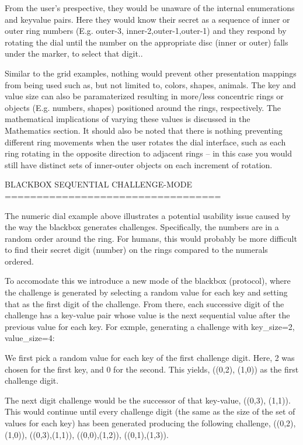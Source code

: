 \documentclass[12pt]{document}
\begin{document}
\begin{Introduction}
From the user's prespective, they would be unaware of the internal enumerations and keyvalue pairs.
Here they would know their secret as a sequence of inner or outer ring numbers (E.g. outer-3, inner-2,outer-1,outer-1) and they respond by rotating the dial until the number on the appropriate disc (inner or outer) falls under the marker, to select that digit..

Similar to the grid examples, nothing would prevent other presentation mappings from being used such as, but not limited to, colors, shapes, animals.
The key and value size can also be paramaterized resulting in more/less concentric rings or objects (E.g. numbers, shapes) positioned around the rings, respectively.
The mathematical implications of varying these values is discussed in the Mathematics section.
It should also be noted that there is nothing preventing different ring movements when the user rotates the dial interface, such as each ring rotating in the opposite direction to adjacent rings -- in this case you would still have distinct sets of inner-outer objects on each increment of rotation.


BLACKBOX SEQUENTIAL CHALLENGE-MODE
==================================

The numeric dial example above illustrates a potential usability issue caused by the way the blackbox generates challenges. Specifically, the numbers are in a random order around the ring. For humans, this would probably be more difficult to find their secret digit (number) on the rings compared to the numerals ordered.

To accomodate this we introduce a new mode of the blackbox (protocol), where the challenge is generated by selecting a random value for each key and setting that as the first digit of the challenge. From there, each successive digit of the challenge has a key-value pair whose value is the next sequential value after the previous value for each key.
For exmple, generating a challenge with key_size=2, value_size=4:

We first pick a random value for each key of the first challenge digit. Here, 2 was chosen for the first key, and 0 for the second.
This yields,
  ((0,2), (1,0))
as the first challenge digit.

The next digit challenge would be the successor of that key-value,
  ((0,3), (1,1)).
This would continue until every challenge digit (the same as the size of the set of values for each key) has been generated producing the following challenge,
((0,2),(1,0)), ((0,3),(1,1)), ((0,0),(1,2)), ((0,1),(1,3)).


\end{Introduction}
\end{document}
